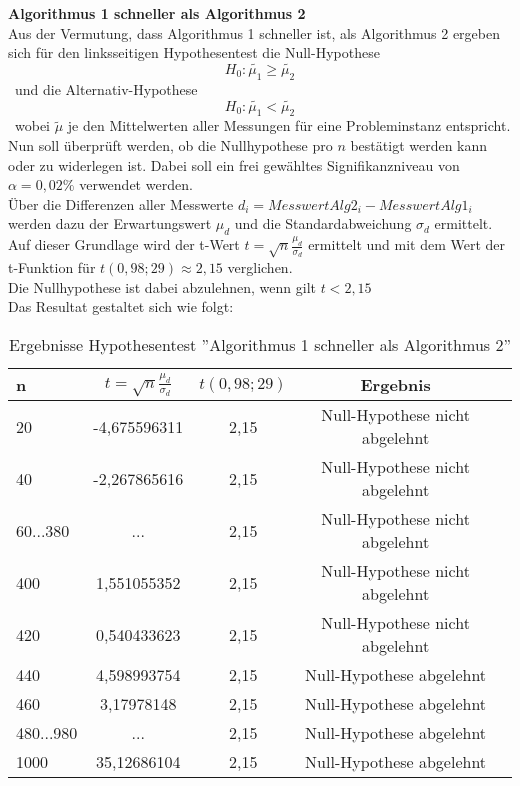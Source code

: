 \documentclass[
10pt, %
a4paper, %
oneside, %
headinclude,footinclude, %
BCOR5mm, %
]{scrartcl}
\begin{document}
\textbf{Algorithmus 1 schneller als Algorithmus 2}\\
Aus der Vermutung, dass Algorithmus 1 schneller ist, als Algorithmus 2 ergeben sich für den linksseitigen Hypothesentest die Null-Hypothese 
\begin{equation}
H_0: \tilde{ \mu_1 } \ge \tilde{\mu_2}
\end{equation}\
und die Alternativ-Hypothese
\begin{equation}
 H_0: \tilde{ \mu_1 } < \tilde{\mu_2}
\end{equation}\
wobei \(\tilde{ \mu}\) je den Mittelwerten aller Messungen für eine Probleminstanz entspricht.\\
Nun soll überprüft werden, ob die Nullhypothese pro \(n\) bestätigt werden kann oder zu widerlegen ist. Dabei soll ein frei gewähltes Signifikanzniveau von \(\alpha = 0,02\%\)  verwendet werden.\\
Über die Differenzen aller Messwerte \(d_i = MesswertAlg2_i - MesswertAlg1_i\) werden dazu der Erwartungswert \(\mu_d\) und die Standardabweichung \(\sigma_d \) ermittelt. Auf dieser Grundlage wird der t-Wert \(t=\sqrt{n}\frac{\mu_d}{\sigma_d} \) ermittelt und mit dem Wert der t-Funktion für \(t(0,98;29)\approx2,15\) verglichen.\\
Die Nullhypothese ist dabei abzulehnen, wenn gilt \(t<2,15\)\\
Das Resultat gestaltet sich wie folgt:
\begin{table}[h!]
	\centering 
	\begin{tabular}{|l|c|c|c|c|}
	\hline
				n   &		\(t=\sqrt{n}\frac{\mu_d}{\sigma_d} \)				& \(t(0,98;29)\) &	Ergebnis\\
	\hline
	20   	&	-4,675596311	& 2,15 &	Null-Hypothese nicht abgelehnt\\
	\hline
	40   	&	-2,267865616	& 2,15 &	Null-Hypothese nicht abgelehnt\\
	\hline
	60...380   &		...			  & 2,15 &		Null-Hypothese nicht abgelehnt\\
	\hline
	400   &		1,551055352   &	 2,15 &	Null-Hypothese nicht abgelehnt\\
	\hline
	420   &		0,540433623   &	 2,15 &	Null-Hypothese nicht abgelehnt\\
	\hline
	440   &		4,598993754   &	 2,15 &	Null-Hypothese abgelehnt\\
	\hline
	460   &		3,17978148    &	 2,15 &	Null-Hypothese abgelehnt\\
	\hline
	480...980   &		...			  &	 2,15 &	Null-Hypothese abgelehnt\\
	\hline
	1000   &		35,12686104	&  2,15 &	Null-Hypothese abgelehnt\\
	\hline
	\end{tabular}\\
	\caption[]{Ergebnisse Hypothesentest ''Algorithmus 1 schneller als Algorithmus 2''}
\end{table}\
\end{document}
